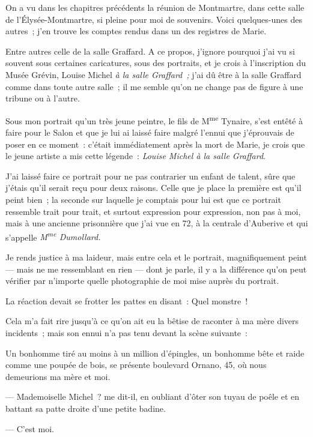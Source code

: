 \documentclass[french,twoside]{book} %
\begin{document}
\noindent On a vu dans les chapitres précédents la réunion de Montmartre, dans cette salle de l’Élysée-Montmartre, si pleine pour moi de souvenirs. Voici quelques-unes des autres ; j’en trouve les comptes rendus dans un des registres de Marie.\par
Entre autres celle de la salle Graffard. A ce propos, j’ignore pourquoi j’ai vu si souvent sous certaines caricatures, sous des portraits, et je crois à l’inscription du Musée Grévin, Louise Michel \emph{à la salle Graffard ;} j’ai dû être à la salle Graffard comme dans toute autre salle ; il me semble qu’on ne change pas de figure à une tribune ou à l’autre.\par
Sous mon portrait qu’un très jeune peintre, le fils de M\textsuperscript{me} Tynaire, s’est entêté à faire pour le  Salon et que je lui ai laissé faire malgré l’ennui que j’éprouvais de poser en ce moment : c’était immédiatement après la mort de Marie, je crois que le jeune artiste a mis cette légende : \emph{Louise Michel à la salle Graffard}.\par
J’ai laissé faire ce portrait pour ne pas contrarier un enfant de talent, sûre que j’étais qu’il serait reçu pour deux raisons. Celle que je place la première est qu’il peint bien ; la seconde sur laquelle je comptais pour lui est que ce portrait ressemble trait pour trait, et surtout expression pour expression, non pas à moi, mais à une ancienne prisonnière que j’ai vue en 72, à la centrale d’Auberive et qui s’appelle \emph{M\textsuperscript{me} Dumollard.}\par
Je rends justice à ma laideur, mais entre cela et le portrait, magnifiquement peint — mais ne me ressemblant en rien — dont je parle, il y a la différence qu’on peut vérifier par n’importe quelle photographie de moi mise auprès du portrait.\par
La réaction devait se frotter les pattes en disant : Quel monstre !\par
Cela m’a fait rire jusqu’à ce qu’on ait eu la bêtise de raconter à ma mère divers incidents ; mais son ennui n’a pas tenu devant la scène suivante :\par
Un bonhomme tiré au moins à un million d’épingles, un bonhomme bête et raide comme  une poupée de bois, se présente boulevard Ornano, 45, où nous demeurions ma mère et moi.\par
— Mademoiselle Michel ? me dit-il, en oubliant d’ôter son tuyau de poêle et en battant sa patte droite d’une petite badine.\par
— C’est moi.\par
\end{document}
